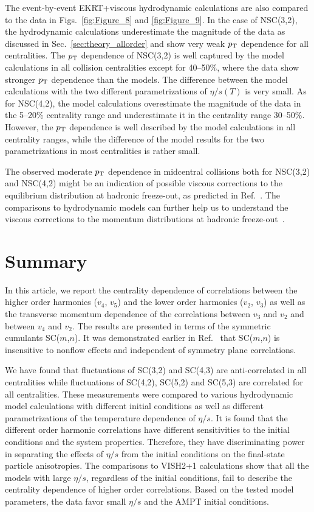 The event-by-event EKRT+viscous hydrodynamic calculations are also compared to the data in Figs.~\ref{fig:Figure_8} and \ref{fig:Figure_9}.
In the case of NSC(3,2), the hydrodynamic calculations underestimate the magnitude of the data as discussed in Sec.~\ref{sec:theory_allorder} and show very weak $p_{\rm T}$ dependence for all centralities.
The $p_{\rm T}$ dependence of NSC(3,2) is well captured by the model calculations in all collision centralities except for 40--50\%, where the data show stronger $p_{\rm T}$ dependence than the models. The difference between the model calculations with the two different parametrizations of $\eta/s(T)$ is very small. 
As for NSC(4,2), the model calculations overestimate the magnitude of the data in the 5--20\% centrality range and underestimate it in the centrality range 30--50\%. However, the $p_{\rm T}$ dependence is well described by the model calculations in all centrality ranges, while the difference of the model results for the two parametrizations in most centralities is rather small.

The observed moderate $p_{\rm T}$ dependence in midcentral collisions both for NSC(3,2) and NSC(4,2) might be an indication of possible viscous corrections to the equilibrium distribution at hadronic freeze-out, as predicted in Ref.~\cite{Niemi:2012aj}.
The comparisons to hydrodynamic models can further help us to understand the viscous corrections to the momentum distributions at hadronic freeze-out~\cite{Dusling:2009df,Luzum:2010ad,Teaney:2012ke,Molnar:2014fva,Niemi:2015qia}.
 
\section{Summary}
\label{sec:summary}
In this article, we report the centrality dependence of correlations between the higher order harmonics ($v_4$, $v_5$) and the lower order harmonics ($v_2$, $v_3$) as well as the transverse momentum dependence of the correlations between $v_3$ and $v_2$ and between $v_4$ and $v_2$.
The results are presented in terms of the symmetric cumulants SC($m$,$n$). It was demonstrated earlier in Ref.~\cite{ALICE:2016kpq} that SC($m$,$n$) is insensitive to nonflow effects and independent of symmetry plane correlations.

We have found that fluctuations of SC(3,2) and SC(4,3) are anti-correlated in all centralities while fluctuations of SC(4,2), SC(5,2) and SC(5,3) are correlated for all centralities. 
These measurements were compared to various hydrodynamic model calculations with different initial conditions as well as different parametrizations of the temperature dependence of $\eta/s$.
It is found that the different order harmonic correlations have different sensitivities to the initial conditions and the system properties. Therefore, they have discriminating power in separating the effects of $\eta/s$  from the initial conditions on the final-state particle anisotropies.
The comparisons to VISH2+1 calculations show that all the models with large $\eta/s$, regardless of the initial conditions, fail to describe the centrality dependence of higher order correlations. 
Based on the tested model parameters, the data favor small $\eta/s$ and the AMPT initial conditions. 

